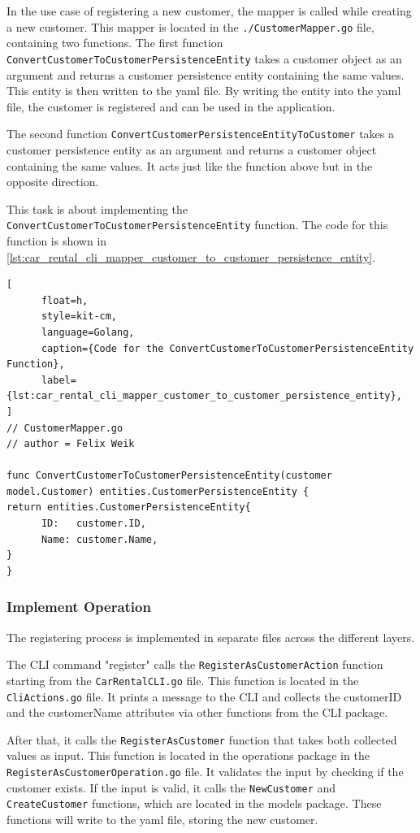 In the use case of registering a new customer, the mapper is called while creating a new customer.
This mapper is located in the \texttt{./CustomerMapper.go} file, containing two functions.
The first function \texttt{ConvertCustomerToCustomerPersistenceEntity} takes a customer object as an argument and returns a customer persistence entity containing the same values.
This entity is then written to the yaml file.
By writing the entity into the yaml file, the customer is registered and can be used in the application.

The second function \texttt{ConvertCustomerPersistenceEntityToCustomer} takes a customer persistence entity as an argument and returns a customer object containing the same values.
It acts just like the function above but in the opposite direction.

This task is about implementing the \texttt{ConvertCustomerToCustomerPersistenceEntity} function.
The code for this function is shown in \autoref{lst:car_rental_cli_mapper_customer_to_customer_persistence_entity}.

\begin{lstlisting}[
      float=h,
      style=kit-cm,
      language=Golang,
      caption={Code for the ConvertCustomerToCustomerPersistenceEntity Function},
      label={lst:car_rental_cli_mapper_customer_to_customer_persistence_entity},
]
// CustomerMapper.go
// author = Felix Weik

func ConvertCustomerToCustomerPersistenceEntity(customer model.Customer) entities.CustomerPersistenceEntity {
return entities.CustomerPersistenceEntity{
      ID:   customer.ID,
      Name: customer.Name,
}
}
\end{lstlisting}

\subsubsection*{Implement Operation}
The registering process is implemented in separate files across the different layers.

The CLI command "register" calls the \texttt{RegisterAsCustomerAction} function starting from the \texttt{CarRentalCLI.go} file.
This function is located in the \texttt{CliActions.go} file.
It prints a message to the CLI and collects the customerID and the customerName attributes via other functions from the CLI package.

After that, it calls the \texttt{RegisterAsCustomer} function that takes both collected \hfill \linebreak values as input.
This function is located in the operations package in the \hfill \linebreak \texttt{RegisterAsCustomerOperation.go} file.
It validates the input by checking if the customer exists.
If the input is valid, it calls the \texttt{NewCustomer} and \texttt{CreateCustomer} functions, which are located in the models package.
These functions will write to the yaml file, storing the new customer.

